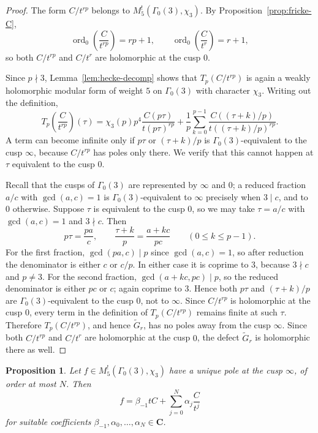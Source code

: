 \documentclass[11pt]{amsart}
\newtheorem{proposition}[theorem]{Proposition}
\theoremstyle{remark}
\DeclareMathOperator{\ord}{ord}
\newcommand{\C}{\mathbf{C}}
\begin{document}
\begin{proof}
The form $C/t^{rp}$ belongs to $M_5^!(\Gamma_0(3),\chi_3)$. By Proposition~\ref{prop:fricke-C},
\[
\ord_0\!\left(\frac{C}{t^{rp}}\right)=rp+1,
\qquad
\ord_0\!\left(\frac{C}{t^r}\right)=r+1,
\]
so both $C/t^{rp}$ and $C/t^r$ are holomorphic at the cusp $0$.

Since $p\nmid3$, Lemma~\ref{lem:hecke-decomp} shows that $T_p(C/t^{rp})$ is again a weakly holomorphic
modular form of weight $5$ on $\Gamma_0(3)$ with character $\chi_3$. Writing out the definition,
\[
T_p\!\left(\frac{C}{t^{rp}}\right)(\tau)
=
\chi_3(p)p^4\frac{C(p\tau)}{t(p\tau)^{rp}}
+\frac1p\sum_{k=0}^{p-1}\frac{C((\tau+k)/p)}{t((\tau+k)/p)^{rp}}.
\]
A term can become infinite only if $p\tau$ or $(\tau+k)/p$ is $\Gamma_0(3)$-equivalent to the cusp
$\infty$, because $C/t^{rp}$ has poles only there. We verify that this cannot happen at $\tau$
equivalent to the cusp $0$.

Recall that the cusps of $\Gamma_0(3)$ are represented by $\infty$ and $0$; a reduced fraction
$a/c$ with $\gcd(a,c)=1$ is $\Gamma_0(3)$-equivalent to $\infty$ precisely when $3\mid c$, and to $0$
otherwise. Suppose $\tau$ is equivalent to the cusp $0$, so we may take $\tau=a/c$ with
$\gcd(a,c)=1$ and $3\nmid c$. Then
\[
p\tau=\frac{pa}{c},
\qquad
\frac{\tau+k}{p}=\frac{a+kc}{pc}
\qquad (0\le k\le p-1).
\]
For the first fraction, $\gcd(pa,c)\mid p$ since $\gcd(a,c)=1$, so after reduction the denominator
is either $c$ or $c/p$. In either case it is coprime to $3$, because $3\nmid c$ and $p\ne3$.
For the second fraction, $\gcd(a+kc,pc)\mid p$, so the reduced denominator is either $pc$ or $c$;
again coprime to $3$. Hence both $p\tau$ and $(\tau+k)/p$ are $\Gamma_0(3)$-equivalent to the cusp
$0$, not to $\infty$. Since $C/t^{rp}$ is holomorphic at the cusp $0$, every term in the definition
of $T_p(C/t^{rp})$ remains finite at such $\tau$. Therefore $T_p(C/t^{rp})$, and hence $\widetilde G_r$,
has no poles away from the cusp $\infty$. Since both $C/t^{rp}$ and $C/t^r$ are holomorphic at the
cusp $0$, the defect $\widetilde G_r$ is holomorphic there as well.
\end{proof}

\begin{proposition}\label{prop:pole-lowering}
Let $f\in M_5^!(\Gamma_0(3),\chi_3)$ have a unique pole at the cusp $\infty$, of order at most $N$.
Then
\[
f=\beta_{-1}tC+\sum_{j=0}^{N}\alpha_j\frac{C}{t^j}
\]
for suitable coefficients $\beta_{-1},\alpha_0,\dots,\alpha_N\in\C$.
\end{proposition}
\end{document}

